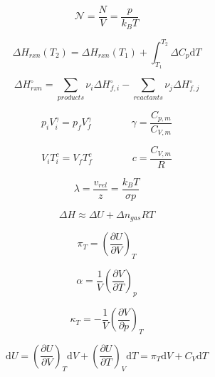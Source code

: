 \documentclass[12pt, letterpaper]{memoir}
\begin{document}
\noindent
\begin{minipage}{0.5\linewidth}
	\begin{equation*}
		\mathcal{N} = \frac{N}{V}=\frac{p}{k_BT}
	\end{equation*}
	
	\begin{equation*}
		\Delta H_{rxn}(T_2) = \Delta H_{rxn}(T_1) + \int_{T_1}^{T_2} \! \Delta C_{p}\mathrm{d}T
	\end{equation*}

	\begin{equation*}
		\Delta H^\circ_{rxn} = \sum\limits_{products} \nu_i\Delta H^\circ_{f,i} - \sum\limits_{reactants} \nu_j\Delta H^\circ_{f,j}
	\end{equation*}
	
	\begin{equation*}
		p_iV_i^\gamma = p_fV_f^\gamma \hspace{4em} \gamma = \dfrac{C_{p,m}}{C_{V,m}}
	\end{equation*}
	
	\begin{equation*}
		V_iT_i^c=V_fT_f^c \hspace{4em} c=\dfrac{C_{V,m}}{R}
	\end{equation*}
\end{minipage}
\begin{minipage}{0.5\linewidth}
	\begin{equation*}
		\lambda = \dfrac{v_{rel}}{z}=\frac{k_BT}{\sigma p}
	\end{equation*}
	
	\begin{equation*}
		\Delta H \approx \Delta U + \Delta n_{gas}RT
	\end{equation*}

	\begin{equation*}
		\pi_T=\left(\frac{\partial U}{\partial V}\right)_{\!\!T}
	\end{equation*}
	
	\begin{equation*}
		\alpha=\frac{1}{V}\left(\dfrac{\partial V}{\partial T}\right)_{\!\!p}
	\end{equation*}
	
	\begin{equation*}
		\kappa_T=-\frac{1}{V}\left(\dfrac{\partial V}{\partial p}\right)_{\!\!T}
	\end{equation*}
\end{minipage}

\begin{equation*}
\mathrm{d}U=\left(\dfrac{\partial U}{\partial V}\right)_{\!\!T}\mathrm{d}V + \left(\dfrac{\partial U}{\partial T}\right)_{\!\!V}\mathrm{d}T=\pi_T\mathrm{d}V + C_V\mathrm{d}T
\end{equation*}
\end{document}
